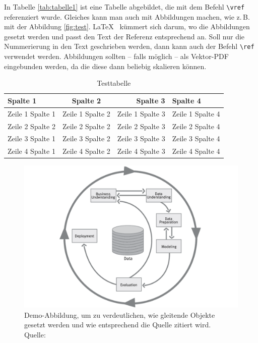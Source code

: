 In Tabelle \vref{tab:tabelle1} ist eine Tabelle abgebildet, die mit dem Befehl \texttt{\textbackslash vref} referenziert wurde. 
Gleiches kann man auch mit Abbildungen machen, wie z.\,B. mit der Abbildung \vref{fig:test}. \LaTeX~ kümmert sich darum, 
wo die Abbildungen gesetzt werden und passt den Text der Referenz entsprechend an. Soll nur die Nummerierung in den Text geschrieben werden, 
dann kann auch der Befehl \texttt{\textbackslash ref} verwendet werden. Abbildungen sollten -- falls möglich -- als Vektor-PDF eingebunden 
werden, da die diese dann beliebig skalieren können.

\lipsum[1]
\begin{table}
	\centering
	\begin{tabular}{p{3cm}crl}
		\textbf{Spalte 1} & \textbf{Spalte 2} & \textbf{Spalte 3} & \textbf{Spalte 4}\\\toprule
		Zeile 1 Spalte 1 &  Zeile 1 Spalte 2 & Zeile 1 Spalte 3 & Zeile 1 Spalte 4\\
		Zeile 2 Spalte 2 &  Zeile 2 Spalte 2 & Zeile 2 Spalte 3 & Zeile 2 Spalte 4\\\midrule
		Zeile 3 Spalte 1 &  Zeile 3 Spalte 2 & Zeile 3 Spalte 3 & Zeile 3 Spalte 4\\
		Zeile 4 Spalte 1 &  Zeile 4 Spalte 2 & Zeile 4 Spalte 3 & Zeile 4 Spalte 4\\\bottomrule
	\end{tabular}
	\caption[Testtabelle]{\label{tab:tabelle1}Testtabelle}
\end{table}

\begin{figure}
	\centering 
	\captionsetup{format=hang}
	\includegraphics[scale=0.16]{imagedir/CRISP-DM}
	\caption[Optionaler Kurztitel für das Abbildunggsverzeichnis]{\label{fig:test}Demo-Abbildung, um zu verdeutlichen, wie gleitende Objekte 
		gesetzt werden und wie entsprechend die Quelle zitiert wird. \\Quelle: \cite[][S. 223]{TD15}}
\end{figure}
	
